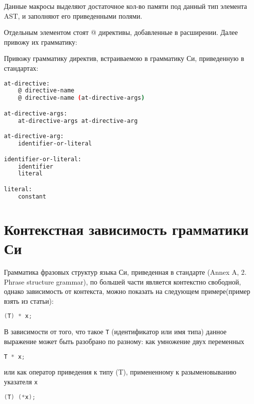 Данные макросы выделяют достаточное кол-во памяти под данный тип элемента AST, и заполняют его приведенными полями.

Отдельным элементом стоят @ директивы, добавленные в расширении.
Далее привожу их грамматику:


Привожу грамматику директив, встраиваемою в грамматику Си, приведенную в стандартах\cite{c99_std}:
\begin{lstlisting}[language=bash, caption={Грамматика @ директив}, label={parsing:at-directive:grammar}]
at-directive:
    @ directive-name
    @ directive-name (at-directive-args)

at-directive-args:
    at-directive-args at-directive-arg     

at-directive-arg:
    identifier-or-literal

identifier-or-literal:
    identifier
    literal

literal:
    constant
\end{lstlisting}

\section{Контекстная зависимость грамматики Си}

Грамматика фразовых структур языка Си, приведенная в стандарте\cite{c99_std} (Annex A, 2. Phrase structure grammar),
по большей части является контекстно свободной, однако зависимость от контекста, можно показать на следующем примере(пример взять из статьи\cite{eli_c_cs}):

\begin{lstlisting}[language=c]
(T) * x;
\end{lstlisting}

В зависимости от того, что такое \verb|T| (идентификатор или имя типа) данное выражение может быть разобрано по разному:
как умножение двух переменных
\begin{lstlisting}[language=c]
T * x;
\end{lstlisting}
или как оператор приведения к типу (T), примененному к разыменовыванию указателя \verb|x|
\begin{lstlisting}[language=c]
(T) (*x);
\end{lstlisting}

